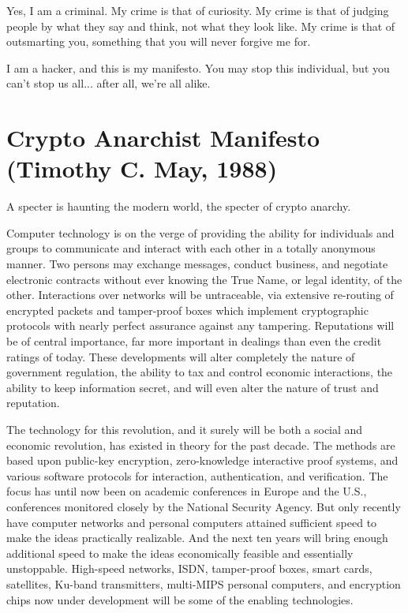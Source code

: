 \documentclass[letterpaper,12pt,english]{sphinxmanual}
\begin{document}
Yes, I am a criminal. My crime is that of curiosity. My crime is that of judging people by what they say and think, not what they look like. My crime is that of outsmarting you, something that you will never forgive me for.

I am a hacker, and this is my manifesto. You may stop this individual, but you can't stop us all... after all, we're all alike.


\chapter{Crypto Anarchist Manifesto (Timothy C. May, 1988)}
\label{1988::doc}\label{1988:crypto-anarchist-manifesto-timothy-c-may-1988}\label{1988:index-0}
A specter is haunting the modern world, the specter of crypto anarchy.

Computer technology is on the verge of providing the ability for individuals and groups to communicate and interact with each other in a totally anonymous manner. Two persons may exchange messages, conduct business, and negotiate electronic contracts without ever knowing the True Name, or legal identity, of the other. Interactions over networks will be untraceable, via extensive re-routing of encrypted packets and tamper-proof boxes which implement cryptographic protocols with nearly perfect assurance against any tampering. Reputations will be of central importance, far more important in dealings than even the credit ratings of today. These developments will alter completely the nature of government regulation, the ability to tax and control economic interactions, the ability to keep information secret, and will even alter the nature of trust and reputation.

The technology for this revolution, and it surely will be both a social and economic revolution, has existed in theory for the past decade. The methods are based upon public-key encryption, zero-knowledge interactive proof systems, and various software protocols for interaction, authentication, and verification. The focus has until now been on academic conferences in Europe and the U.S., conferences monitored closely by the National Security Agency. But only recently have computer networks and personal computers attained sufficient speed to make the ideas practically realizable. And the next ten years will bring enough additional speed to make the ideas economically feasible and essentially unstoppable. High-speed networks, ISDN, tamper-proof boxes, smart cards, satellites, Ku-band transmitters, multi-MIPS personal computers, and encryption chips now under development will be some of the enabling technologies.
\end{document}
